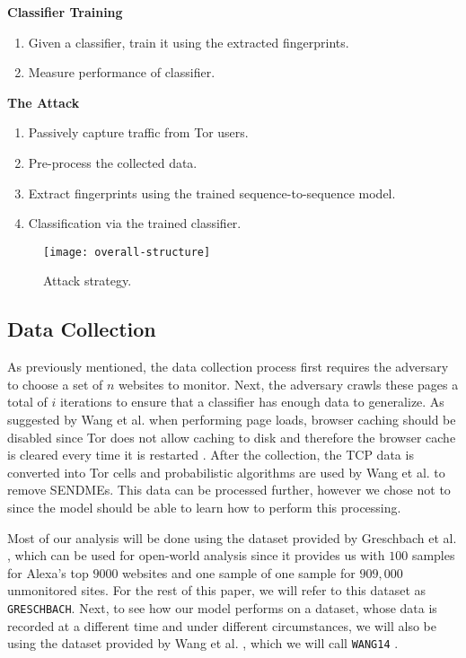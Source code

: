 \noindent
\textbf{Classifier Training}
\begin{enumerate}[resume]
  \item Given a classifier, train it using the extracted fingerprints.
  \item Measure performance of classifier.
\end{enumerate}

\newpage

\noindent
\textbf{The Attack}
\begin{enumerate}[resume]
  \item Passively capture traffic from Tor users.
  \item Pre-process the collected data.
  \item Extract fingerprints using the trained sequence-to-sequence model.
  \item Classification via the trained classifier.
\end{enumerate}

\begin{figure}[ht]
  \centering
  \texttt{[image: overall-structure]}
  \caption{Attack strategy.}
  \label{fig:attack-strategy}
\end{figure}

\subsection{Data Collection} \label{sec:data_collection1}

As previously mentioned, the data collection process first requires the adversary to choose a set of $n$ websites to monitor.
Next, the adversary crawls these pages a total of $i$ iterations to ensure that a classifier has enough data to generalize.
As suggested by Wang et al. when performing page loads, browser caching should be disabled since Tor does not allow caching to disk and therefore the browser cache is cleared every time it is restarted \cite{wang_goldberg_2013}.
After the collection, the TCP data is converted into Tor cells and probabilistic algorithms are used by Wang et al. \cite{wang_goldberg_2013} to remove SENDMEs.
This data can be processed further, however we chose not to since the model should be able to learn how to perform this processing.

Most of our analysis will be done using the dataset provided by Greschbach et al. \cite{greschbach2016effect}, which can be used for open-world analysis since it provides us with $100$ samples for Alexa's top $9000$ websites and one sample of one sample for $909,000$ unmonitored sites.
For the rest of this paper, we will refer to this dataset as \texttt{GRESCHBACH}.
Next, to see how our model performs on a dataset, whose data is recorded at a different time and under different circumstances, we will also be using the dataset provided by Wang et al. \cite{wang_cai_johnson_nithyanand_goldberg_2014}, which we will call \texttt{WANG14} \cite{panchenko2}.

